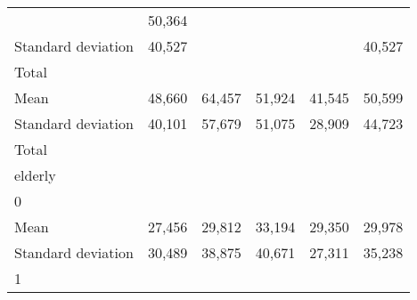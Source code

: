 \begin{tabular}{llllll}
  \multicolumn{1}{r}{} &
  \multicolumn{1}{r}{50,364} \\
\multicolumn{1}{l}{\hspace{4em}Standard deviation} &
  \multicolumn{1}{|r}{40,527} &
  \multicolumn{1}{r}{} &
  \multicolumn{1}{r}{} &
  \multicolumn{1}{r}{} &
  \multicolumn{1}{r}{40,527} \\
\multicolumn{1}{l}{\hspace{3em}Total} &
  \multicolumn{1}{|r}{} &
  \multicolumn{1}{r}{} &
  \multicolumn{1}{r}{} &
  \multicolumn{1}{r}{} &
  \multicolumn{1}{r}{} \\
\multicolumn{1}{l}{\hspace{4em}Mean} &
  \multicolumn{1}{|r}{48,660} &
  \multicolumn{1}{r}{64,457} &
  \multicolumn{1}{r}{51,924} &
  \multicolumn{1}{r}{41,545} &
  \multicolumn{1}{r}{50,599} \\
\multicolumn{1}{l}{\hspace{4em}Standard deviation} &
  \multicolumn{1}{|r}{40,101} &
  \multicolumn{1}{r}{57,679} &
  \multicolumn{1}{r}{51,075} &
  \multicolumn{1}{r}{28,909} &
  \multicolumn{1}{r}{44,723} \\
\multicolumn{1}{l}{\hspace{1em}Total} &
  \multicolumn{1}{|r}{} &
  \multicolumn{1}{r}{} &
  \multicolumn{1}{r}{} &
  \multicolumn{1}{r}{} &
  \multicolumn{1}{r}{} \\
\multicolumn{1}{l}{\hspace{2em}elderly} &
  \multicolumn{1}{|r}{} &
  \multicolumn{1}{r}{} &
  \multicolumn{1}{r}{} &
  \multicolumn{1}{r}{} &
  \multicolumn{1}{r}{} \\
\multicolumn{1}{l}{\hspace{3em}0} &
  \multicolumn{1}{|r}{} &
  \multicolumn{1}{r}{} &
  \multicolumn{1}{r}{} &
  \multicolumn{1}{r}{} &
  \multicolumn{1}{r}{} \\
\multicolumn{1}{l}{\hspace{4em}Mean} &
  \multicolumn{1}{|r}{27,456} &
  \multicolumn{1}{r}{29,812} &
  \multicolumn{1}{r}{33,194} &
  \multicolumn{1}{r}{29,350} &
  \multicolumn{1}{r}{29,978} \\
\multicolumn{1}{l}{\hspace{4em}Standard deviation} &
  \multicolumn{1}{|r}{30,489} &
  \multicolumn{1}{r}{38,875} &
  \multicolumn{1}{r}{40,671} &
  \multicolumn{1}{r}{27,311} &
  \multicolumn{1}{r}{35,238} \\
\multicolumn{1}{l}{\hspace{3em}1} &
  \multicolumn{1}{|r}{} &
  \multicolumn{1}{r}{} &

\end{tabular}
